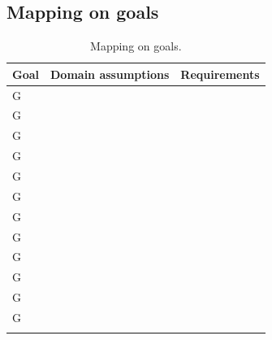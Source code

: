 \subsection{Mapping on goals}
\label{subsec: map_on_g}%
\setcounter{mg}{1}
\newcommand{\cmg}{\themg\stepcounter{mg}}
\begin{center}
    \begin{longtable}{|l|l|l|}
        \hline
        \textbf{Goal} & \textbf{Domain assumptions} & \textbf{Requirements} \\
        \hline
        G\cmg         &                             &                       \\
        \hline
        G\cmg         &                             &                       \\
        \hline
        G\cmg         &                             &                       \\
        \hline
        G\cmg         &                             &                       \\
        \hline
        G\cmg         &                             &                       \\
        \hline
        G\cmg         &                             &                       \\
        \hline
        G\cmg         &                             &                       \\
        \hline
        G\cmg         &                             &                       \\
        \hline
        G\cmg         &                             &                       \\
        \hline
        G\cmg         &                             &                       \\
        \hline
        G\cmg         &                             &                       \\
        \hline
        G\cmg         &                             &                       \\
        \hline
        \caption{Mapping on goals.}
        \label{tab: map_on_g}%
    \end{longtable}
\end{center}

